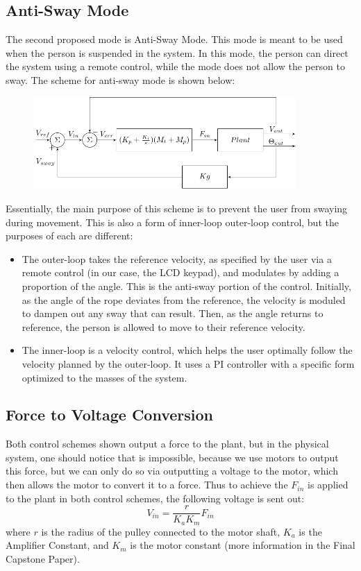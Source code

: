 \documentclass[letterpaper]{article}
\begin{document}
\subsection{Anti-Sway Mode}

The second proposed mode is Anti-Sway Mode. This mode is meant to be used when the person is suspended in the system. In this mode, the person can direct the system using a remote control, while the mode does not allow the person to sway. The scheme for anti-sway mode is shown below:

\begin{figure}[H]
    \centering
    \includegraphics[width=10cm]{antisway_block.pdf}
\end{figure}

Essentially, the main purpose of this scheme is to prevent the user from swaying during movement. This is also a form of inner-loop outer-loop control, but the purposes of each are different:
\begin{itemize}
    \item The outer-loop takes the reference velocity, as specified by the user via a remote control (in our case, the LCD keypad), and modulates by adding a proportion of the angle. This is the anti-sway portion of the control. Initially, as the angle of the rope deviates from the reference, the velocity is moduled to dampen out any sway that can result. Then, as the angle returns to reference, the person is allowed to move to their reference velocity.
    \item The inner-loop is a velocity control, which helps the user optimally follow the velocity planned by the outer-loop. It uses a PI controller with a specific form optimized to the masses of the system.
\end{itemize}

\subsection{Force to Voltage Conversion}
Both control schemes shown output a force to the plant, but in the physical system, one should notice that is impossible, because we use motors to output this force, but we can only do so via outputting a voltage to the motor, which then allows the motor to convert it to a force. Thus to achieve the $F_{in}$ is applied to the plant in both control schemes, the following voltage is sent out:
$$\boxed{V_{in}=\frac{r}{K_aK_m}F_{in}}$$
where $r$ is the radius of the pulley connected to the motor shaft, $K_a$ is the Amplifier Constant, and $K_m$ is the motor constant (more information in the Final Capstone Paper).
\end{document}

